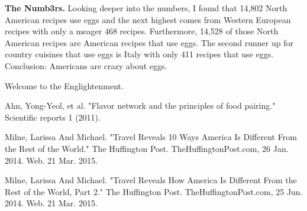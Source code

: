 \documentclass[14pt]{extarticle}
\begin{document}
\raggedright

\vspace{5mm}
\textbf{The Numb3rs.} Looking deeper into the numbers, I found that 14,802 North American recipes use eggs and the next highest comes from Western European recipes with only a meager 468 recipes. Furthermore,  14,528 of those North American recipes are American recipes that use eggs. The second runner up for country cuisines that use eggs is Italy with only 411 recipes that use eggs. Conclusion: Americans are crazy about eggs. 

\vspace{5mm}
Welcome to the Englightenment. 

\begin{thebibliography}{}

\bibitem{} Ahn, Yong-Yeol, et al. "Flavor network and the principles of food pairing." Scientific reports 1 (2011).

\bibitem{} Milne, Larissa And Michael. "Travel Reveals 10 Ways America Is Different From the Rest of the World." The Huffington Post. TheHuffingtonPost.com, 26 Jan. 2014. Web. 21 Mar. 2015.

\bibitem{} Milne, Larissa And Michael. "Travel Reveals How America Is Different From the Rest of the World, Part 2." The Huffington Post. TheHuffingtonPost.com, 25 Jun. 2014. Web. 21 Mar. 2015.

\end{thebibliography}
\end{document}
